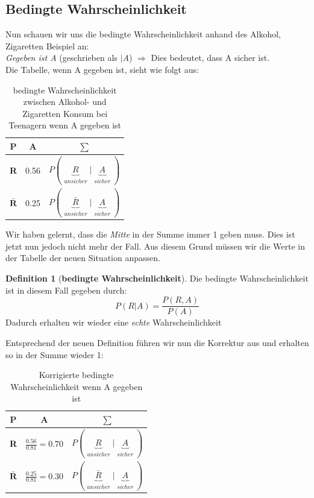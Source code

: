 \documentclass[a4paper]{article}
\theoremstyle{definition}
\newtheorem{definition}{Definition}
\theoremstyle{example}
\begin{document}
\subsection{Bedingte Wahrscheinlichkeit}
Nun schauen wir uns die bedingte Wahrscheinlichkeit anhand des Alkohol, Zigaretten Beispiel an:\\
\textit{Gegeben ist A} (geschrieben als $|A$) $\Rightarrow$ Dies bedeutet, dass A sicher ist.\\
Die Tabelle, wenn A gegeben ist, sieht wie folgt aus:\\
\begin{table}[h!]
	\begin{center}
		\caption{bedingte Wahrscheinlichkeit zwischen Alkohol- und Zigaretten Konsum bei Teenagern wenn A gegeben ist}
		\label{tab: table1}
		\begin{tabular}{c|c|c}
			\textbf{P} & \textbf{A} & \textbf{$\sum$}\\
			\hline
			\textbf{R} & 0.56 & $P(\underbrace{R}_{\substack{unsicher}} | \underbrace{A}_{\substack{sicher}})$\\[15pt]
			\textbf{$\mathbf{\bar{R}}$} & 0.25 & $P(\underbrace{\bar{R}}_{\substack{unsicher}} | \underbrace{A}_{\substack{sicher}})$
		\end{tabular}
	\end{center}
\end{table}
Wir haben gelernt, dass die \textit{Mitte} in der Summe immer 1 geben muss. Dies ist jetzt nun jedoch nicht mehr der Fall. Aus diesem Grund müssen wir die Werte in der Tabelle der neuen Situation anpassen. \\
\begin{tcolorbox}
\begin{definition}[\textbf{bedingte Wahrscheinlichkeit}]
Die bedingte Wahrscheinlichkeit ist in diesem Fall gegeben durch:
\begin{equation}
P(R|A) = \frac{P(R,A)}{P(A)}
\end{equation}
Dadurch erhalten wir wieder eine \textit{echte} Wahrscheinlichkeit
\end{definition}
\end{tcolorbox}
\newpage
Entsprechend der neuen Definition führen wir nun die Korrektur aus und erhalten so in der Summe wieder 1:\\
\begin{table}[h!]
	\begin{center}
		\caption{Korrigierte bedingte Wahrscheinlichkeit wenn A gegeben ist}
		\label{tab: table1}
		\begin{tabular}{c|c|c}
			\textbf{P} & \textbf{A} & \textbf{$\sum$}\\
			\hline
			\rule{0pt}{1.2\normalbaselineskip} \textbf{R} & $\frac{0.56}{0.81} = 0.70$ & $P(\underbrace{R}_{\substack{unsicher}} | \underbrace{A}_{\substack{sicher}})$\\[15pt]
			\textbf{$\mathbf{\bar{R}}$} & $\frac{0.25}{0.81} = 0.30$ & $P(\underbrace{\bar{R}}_{\substack{unsicher}} | \underbrace{A}_{\substack{sicher}})$
		\end{tabular}
	\end{center}
\end{table}
\end{document}
